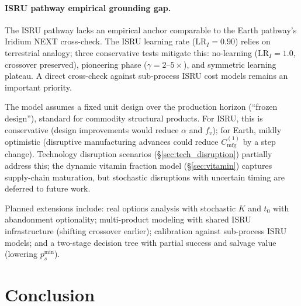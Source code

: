 \documentclass[preprint,12pt]{elsarticle}
\begin{document}
\paragraph{ISRU pathway empirical grounding gap.} The ISRU pathway lacks an empirical anchor comparable to the Earth pathway's Iridium NEXT cross-check. The ISRU learning rate ($\mathrm{LR}_I = 0.90$) relies on terrestrial analogy; three conservative tests mitigate this: no-learning ($\mathrm{LR}_I = 1.0$, crossover preserved), pioneering phase ($\gamma = 2$--$5\times$), and symmetric learning plateau. A direct cross-check against sub-process ISRU cost models remains an important priority.

The model assumes a fixed unit design over the production horizon (``frozen design''), standard for commodity structural products. For ISRU, this is conservative (design improvements would reduce $\alpha$ and $f_v$); for Earth, mildly optimistic (disruptive manufacturing advances could reduce $C_{\mathrm{mfg}}^{(1)}$ by a step change). Technology disruption scenarios (\S\ref{sec:tech_disruption}) partially address this; the dynamic vitamin fraction model (\S\ref{sec:vitamin}) captures supply-chain maturation, but stochastic disruptions with uncertain timing are deferred to future work.

Planned extensions include: real options analysis with stochastic $K$ and $t_0$ with abandonment optionality; multi-product modeling with shared ISRU infrastructure (shifting crossover earlier); calibration against sub-process ISRU models; and a two-stage decision tree with partial success and salvage value (lowering $p_s^{\min}$).

\section{Conclusion}
\label{sec:conclusion}
\end{document}
